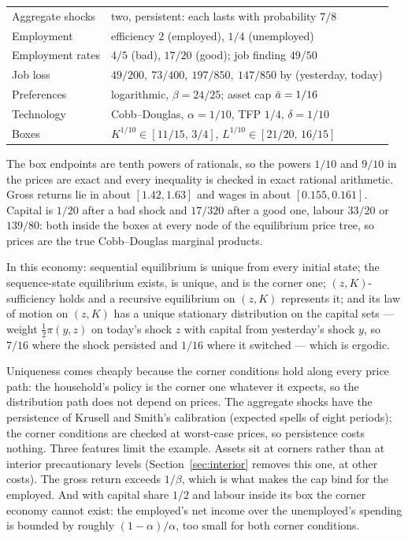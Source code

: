 \begin{center}
\begin{tabular}{ll}
\toprule
Aggregate shocks & two, persistent: each lasts with probability $7/8$ \\
Employment & efficiency $2$ (employed), $1/4$ (unemployed) \\
Employment rates & $4/5$ (bad), $17/20$ (good); job finding $49/50$ \\
Job loss & $49/200,\ 73/400,\ 197/850,\ 147/850$ by (yesterday, today) \\
Preferences & logarithmic, $\beta=24/25$; asset cap $\bar a=1/16$ \\
Technology & Cobb--Douglas, $\alpha=1/10$, TFP $1/4$, $\delta=1/10$ \\
Boxes & $K^{1/10}\in[11/15,\,3/4]$, $L^{1/10}\in[21/20,\,16/15]$ \\
\bottomrule
\end{tabular}
\end{center}

\noindent
The box endpoints are tenth powers of rationals, so the powers $1/10$ and $9/10$ in the prices are
exact and every inequality is checked in exact rational arithmetic. Gross returns lie in about
$[1.42,1.63]$ and wages in about $[0.155,0.161]$. Capital is $1/20$ after a bad shock and $17/320$
after a good one, labour $33/20$ or $139/80$: both inside the boxes at every node of the equilibrium
price tree, so prices are the true Cobb--Douglas marginal products.

\begin{theorem}\label{thm:corner}
In this economy: sequential equilibrium is unique from every initial state; the sequence-state
equilibrium exists, is unique, and is the corner one; $(z,K)$-sufficiency holds and a recursive
equilibrium on $(z,K)$ represents it; and its law of motion on $(z,K)$ has a unique stationary
distribution on the capital sets --- weight $\tfrac12\pi(y,z)$ on today's shock $z$ with capital
from yesterday's shock $y$, so $7/16$ where the shock persisted and $1/16$ where it switched ---
which is ergodic.
\end{theorem}

\noindent
Uniqueness comes cheaply because the corner conditions hold along every price path: the household's
policy is the corner one whatever it expects, so the distribution path does not depend on prices.
The aggregate shocks have the persistence of Krusell and Smith's calibration (expected spells of
eight periods); the corner conditions are checked at worst-case prices, so persistence costs
nothing. Three features limit the example. Assets sit at corners rather than at interior
precautionary levels (Section~\ref{sec:interior} removes this one, at other costs). The gross return exceeds $1/\beta$, which is what makes the cap bind for the employed. And
with capital share $1/2$ and labour inside its box the corner economy cannot exist: the employed's
net income over the unemployed's spending is bounded by roughly $(1-\alpha)/\alpha$, too small for
both corner conditions.

